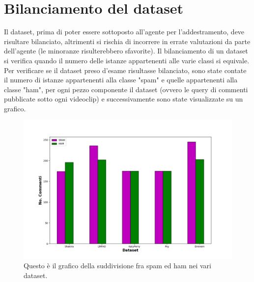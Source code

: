 \documentclass{report}
\begin{document}
   

    \section{Bilanciamento del dataset}
    
    Il dataset, prima di poter essere sottoposto all'agente per l'addestramento, deve risultare bilanciato,
    altrimenti si rischia di incorrere in errate valutazioni da parte dell'agente (le minoranze risulterebbero sfavorite).
    \newline
    Il bilanciamento di un dataset si verifica quando il numero delle istanze appartenenti alle varie classi si equivale.
    Per verificare se il dataset preso d'esame risultasse bilanciato, sono state contate il numero di istanze appartenenti 
    alla classe "spam" e quelle appartenenti alla classe "ham", per ogni pezzo componente il dataset (ovvero le query di 
    commenti pubblicate sotto ogni videoclip) e successivamente sono state visualizzate su un grafico.
    
    \begin{figure}[h]
        \centering
        \includegraphics[width = \textwidth]{immagini/DatasetSeparati.png}
        \caption{Questo è il grafico della suddivisione fra spam ed ham nei vari dataset.}

    \end{figure}
    
\end{document}
